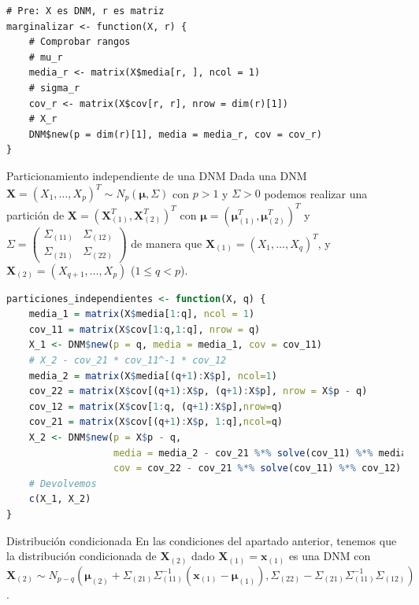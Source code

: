 \documentclass[xcolor=table]{beamer}
\begin{document}
\begin{frame}[fragile]

     
     \begin{lstlisting}
# Pre: X es DNM, r es matriz
marginalizar <- function(X, r) {
    # Comprobar rangos
    # mu_r
    media_r <- matrix(X$media[r, ], ncol = 1)
    # sigma_r
    cov_r <- matrix(X$cov[r, r], nrow = dim(r)[1])
    # X_r
    DNM$new(p = dim(r)[1], media = media_r, cov = cov_r)
}
\end{lstlisting}




\end{frame}

\begin{frame}[fragile]{Particionamiento independiente de una DNM}
Dada una DNM $\pmb{X} = (X_1, \ldots, X_p)^T \sim N_p(\pmb{\mu}, \Sigma)$ con $p > 1$ y $\Sigma > 0$ podemos realizar una partición de $\pmb{X} = (\pmb{X}_{(1)}^T, \pmb{X}_{(2)}^T)^T$ con $\pmb{\mu} = (\pmb{\mu}_{(1)}^T,\pmb{\mu}_{(2)}^T)^T$ y $\Sigma = \begin{pmatrix} \Sigma_{(11)} & \Sigma_{(12)} \\ \Sigma_{(21)} & \Sigma_{(22)} \end{pmatrix} $ de manera que $\pmb{X}_{(1)} = (X_1, \ldots, X_q)^T$, y $\pmb{X}_{(2)} = (X_{q+1}, \ldots, X_p)$ ($1 \leq q < p$).

\end{frame}

\begin{frame}[fragile]
\scriptsize
     \begin{lstlisting}[language=R, basicstyle=\ttfamily]
particiones_independientes <- function(X, q) {
    media_1 = matrix(X$media[1:q], ncol = 1)
    cov_11 = matrix(X$cov[1:q,1:q], nrow = q)
    X_1 <- DNM$new(p = q, media = media_1, cov = cov_11)
    # X_2 - cov_21 * cov_11^-1 * cov_12
    media_2 = matrix(X$media[(q+1):X$p], ncol=1)
    cov_22 = matrix(X$cov[(q+1):X$p, (q+1):X$p], nrow = X$p - q)
    cov_12 = matrix(X$cov[1:q, (q+1):X$p],nrow=q)
    cov_21 = matrix(X$cov[(q+1):X$p, 1:q],ncol=q)
    X_2 <- DNM$new(p = X$p - q,
                   media = media_2 - cov_21 %*% solve(cov_11) %*% media_1,
                   cov = cov_22 - cov_21 %*% solve(cov_11) %*% cov_12)
    # Devolvemos
    c(X_1, X_2)
}
\end{lstlisting}
\end{frame}

\begin{frame}{Distribución condicionada}
En las condiciones del apartado anterior, tenemos que la distribución condicionada de $\pmb{X}_{(2)}$ dado $\pmb{X}_{(1)} = \pmb{x}_{(1)}$ es una DNM con $\pmb{X}_{(2)} \sim N_{p-q}(\pmb{\mu}_{(2)}+\Sigma_{(21)} \Sigma_{(11)}^{-1}(\pmb{x}_{(1)} - \pmb{\mu}_{(1)}), \Sigma_{(22)} - \Sigma_{(21)} \Sigma_{(11)}^{-1}\Sigma_{(12)})$.

\end{frame}
\end{document}
